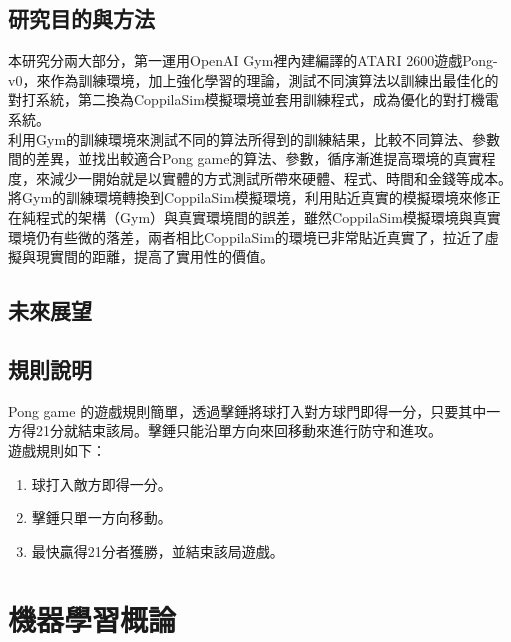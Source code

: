 \documentclass[14pt,a4paper]{report}  %
\begin{document}
\section{研究目的與方法}
 本研究分兩大部分，第一運用OpenAI Gym裡內建編譯的ATARI 2600遊戲Pong-v0，來作為訓練環境，加上強化學習的理論，測試不同演算法以訓練出最佳化的對打系統，第二換為CoppilaSim模擬環境並套用訓練程式，成為優化的對打機電系統。\\
 
 利用Gym的訓練環境來測試不同的算法所得到的訓練結果，比較不同算法、參數間的差異，並找出較適合Pong game的算法、參數，循序漸進提高環境的真實程度，來減少一開始就是以實體的方式測試所帶來硬體、程式、時間和金錢等成本。\\

 將Gym的訓練環境轉換到CoppilaSim模擬環境，利用貼近真實的模擬環境來修正在純程式的架構（Gym）與真實環境間的誤差，雖然CoppilaSim模擬環境與真實環境仍有些微的落差，兩者相比CoppilaSim的環境已非常貼近真實了，拉近了虛擬與現實間的距離，提高了實用性的價值。
\section{未來展望}
\qquad 
\section{規則說明}
 Pong game 的遊戲規則簡單，透過擊錘將球打入對方球門即得一分，只要其中一方得21分就結束該局。擊錘只能沿單方向來回移動來進行防守和進攻。\\
遊戲規則如下：
\begin{enumerate}
\item 球打入敵方即得一分。
\item 擊錘只單一方向移動。
\item 最快贏得21分者獲勝，並結束該局遊戲。
\end{enumerate}

\renewcommand{\baselinestretch}{0.5} %
\chapter{機器學習概論}
\end{document}

